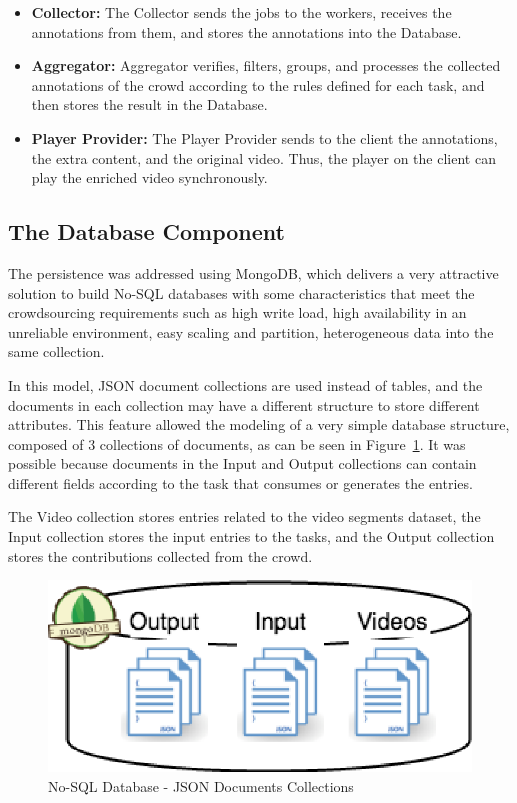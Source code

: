 \begin{itemize}

\item \textbf{Collector: } The Collector sends the jobs to the workers, receives the annotations from them, and stores the annotations into the Database.

\item \textbf{Aggregator: } Aggregator verifies, filters, groups, and processes the collected annotations of the crowd according to the rules defined for each task, and then stores the result in the Database.

\item \textbf{Player Provider: } The Player Provider sends to the client the annotations, the extra content, and the original video. Thus, the player on the client can play the enriched video synchronously.

\end{itemize}

\subsection{The Database Component}
The persistence was addressed using MongoDB, which delivers a very attractive solution to build No-SQL databases with some characteristics that meet the crowdsourcing requirements such as high write load, high availability in an unreliable environment,  easy scaling and partition, heterogeneous data into the same collection.

In this model, JSON document collections are used instead of tables, and the documents in each collection may have a different structure to store different attributes. This feature allowed the modeling of a very simple database structure, composed of 3 collections of documents, as can be seen in Figure~\ref{persistence}. It was possible because documents in the Input and Output collections can contain different fields according to the task that consumes or generates the entries.

The Video collection stores entries related to the video segments dataset, the Input collection stores the input entries to the tasks, and the Output collection stores the contributions collected from the crowd.

\begin{figure}[h]
	\centerline{\includegraphics[scale=0.3] {figure/Persistence}}
	\caption{No-SQL Database - JSON Documents Collections}
	\label{persistence}
\end{figure}

